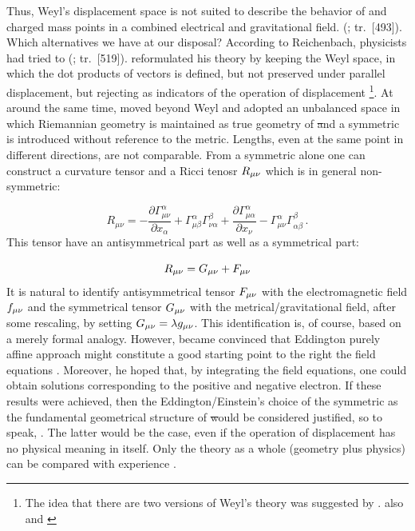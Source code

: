 \documentclass[submitted]{article}
\newcommand{\faradaymn}{\ensuremath{f\mn}}
\renewcommand{\rzlap}[2]{(\cite[#1]{Reichenbach1928}; tr.\ [#2])\xspace}
\begin{document}
Thus, Weyl's displacement space is not suited to describe the behavior of \rac and charged mass points in a combined electrical and gravitational field.  \rzlap{353}{493}. Which alternatives we have at our disposal? According to Reichenbach, physicists had tried to  \rzlap{371}{519}. \citet{Weyl1921} reformulated his theory by keeping the  Weyl space, in which the dot products of vectors is defined, but not preserved under parallel displacement, but rejecting \rac as indicators of the operation of displacement \Gtmn\footnote{The idea that there are two versions of Weyl's theory was suggested by \cite{Pauli1921a}. \Cf also \citep{Weyl1921e} and \citep[367--368]{Reichenbach1921}}. At around the same time, \citet{Eddington1921} moved beyond Weyl and adopted an unbalanced space in which Riemannian geometry is maintained as true geometry of \st and a symmetric \Gtmn is introduced without reference to the metric. Lengths, even at the same point in different directions, are not comparable. From a symmetric \Gtmn alone one can construct a curvature tensor \ritea and a Ricci tenosr $R_{\mu\nu}$ which is in general non-symmetric:

\begin{equation*}
R_{\mu \nu}=-\frac{\partial \Gamma_{\mu \nu}^{\alpha}}{\partial x_{\alpha}}+\Gamma_{\mu \beta}^{\alpha} \Gamma_{\nu \alpha}^{\beta}+\frac{\partial \Gamma_{\mu \alpha}^{\alpha}}{\partial x_{\nu}}-\Gamma_{\mu \nu}^{\alpha} \Gamma_{\alpha \beta}^{\beta}\,.
\end{equation*}
%
This tensor have an antisymmetrical part as well as a symmetrical part:

\begin{equation*}
R_{\mu\nu}=G_{\mu\nu}+ F_{\mu\nu}
\end{equation*}
%
It is natural to identify antisymmetrical tensor $F_{\mu\nu}$ with the electromagnetic field $\faradaymn$ and the symmetrical tensor $G_{\mu\nu}$ with the metrical/gravitational field, after some rescaling, by setting $G_{\mu\nu}=\lambda g_{\mu\nu}$. This identification is, of course, based on a merely formal analogy. However, \citet{Einstein1923c,Einstein1923d,Einstein1925d} became convinced that Eddington purely affine approach might constitute a good starting point to  the right the field equations . Moreover, he hoped that, by integrating the field equations, one could obtain solutions corresponding to the positive and negative electron. If these results were achieved, then the Eddington/Einstein's choice of the symmetric \Gtmn as the fundamental geometrical structure of \st would be considered justified, so to speak, . The latter would be the case, even if the operation of displacement has no physical meaning in itself. Only the theory as a whole (geometry plus physics) can be compared with experience \citet{Einstein1921b,Einstein1924,Einstein1926}.
\end{document}
